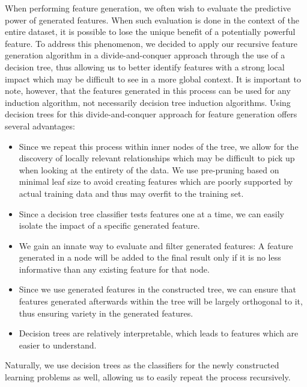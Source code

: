 \documentclass[twoside,11pt]{article}
\theoremstyle{definition}
\begin{document}
When performing feature generation, we often wish to evaluate the predictive power of generated features. When such evaluation is done in the context of the entire dataset, it is possible to lose the unique benefit of a potentially powerful feature. To address this phenomenon, we decided to apply our recursive feature generation algorithm in a divide-and-conquer approach through the use of a decision tree, thus allowing us to better identify features with a strong local impact which may be difficult to see in a more global context. It is important to note, however, that the features generated in this process can be used for any induction algorithm, not necessarily decision tree induction algorithms.
Using decision trees for this divide-and-conquer approach for feature generation offers several advantages:
\begin{itemize}
	\item Since we repeat this process within inner nodes of the tree, we allow for the discovery of locally relevant relationships which may be difficult to pick up when looking at the entirety of the data. We use pre-pruning based on minimal leaf size to avoid creating features which are poorly supported by actual training data and thus may overfit to the training set.
	\item Since a decision tree classifier tests features one at a time, we can easily isolate the impact of a specific generated feature.
	\item We gain an innate way to evaluate and filter generated features: A feature generated in a node will be added to the final result only if it is no less informative than any existing feature for that node.
	\item Since we use generated features in the constructed tree, we can ensure that features generated afterwards within the tree will be largely orthogonal to it, thus ensuring variety in the generated features. 
	\item Decision trees are relatively interpretable, which leads to features which are easier to understand.
\end{itemize}
Naturally, we use decision trees as the classifiers for the newly constructed learning problems as well, allowing us to easily repeat the process recursively. %
\end{document}
